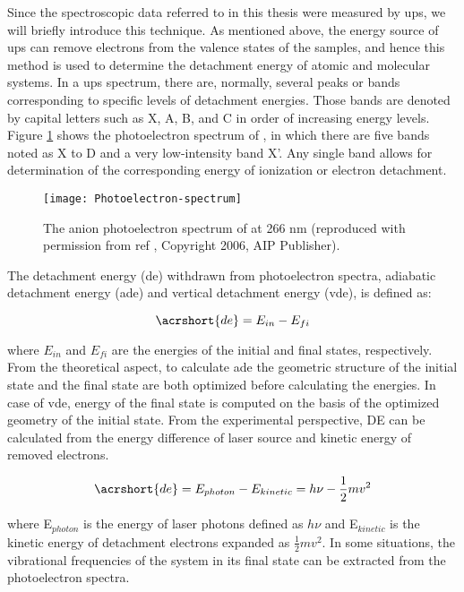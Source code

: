 \begin{refsection}
Since the spectroscopic data referred to in this thesis were measured by \acrshort{ups}, we will briefly introduce this technique. As mentioned above, the energy source of \acrshort{ups} can remove electrons from the valence states of the samples, and hence this method is used to determine the detachment energy of atomic and molecular systems. In a \acrshort{ups} spectrum, there are, normally, several peaks or bands corresponding to specific levels of detachment energies. Those bands are denoted by capital letters such as X, A, B, and C in order of increasing energy levels. Figure \ref{fig:c1:cr2o2spectrum} shows the photoelectron spectrum of , in which there are five bands noted as X to D and a very low-intensity band X'. Any single band allows for determination of the corresponding energy of ionization or electron detachment. 


\begin{figure}[htpb!]
	\centering
	\texttt{[image: Photoelectron-spectrum]}
	\caption{The anion photoelectron spectrum of  at 266 nm (reproduced with permission from ref , Copyright 2006, AIP Publisher).}
	\label{fig:c1:cr2o2spectrum}
\end{figure}

The detachment energy (\acrshort{de}) withdrawn from photoelectron spectra, adiabatic detachment energy (\acrshort{ade}) and vertical detachment energy (\acrshort{vde}), is defined as:

\begin{equation}
		\acrshort{de} = E_{in} - E_{fi} 
\end{equation}

\noindent where $E_{in}$ and $E_{fi}$ are the energies of the initial and final states, respectively. From the theoretical aspect, to calculate \acrshort{ade} the geometric structure of the initial state and the final state are both optimized before calculating the energies. In case of \acrshort{vde}, energy of the final state is computed on the basis of the optimized geometry of the initial state. From the experimental perspective, DE can be calculated from the energy difference of laser source and kinetic energy of removed electrons. 

\begin{equation}
		\acrshort{de} = E_{photon} - E_{kinetic} = h\nu - \frac{1}{2}mv^2
\end{equation}

\noindent where E$_{photon}$ is the energy of laser photons defined as $h\nu$ and E$_{kinetic}$ is the kinetic energy of detachment electrons expanded as $\frac{1}{2}mv^2$. In some situations, the vibrational frequencies of the system in its final state can be extracted from the photoelectron spectra. 



\end{refsection}
